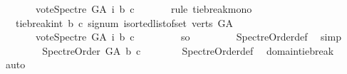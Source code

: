 \begin{isabellebody}
\ \ \ \ \ \ \ vote{\isacharunderscore}{\kern0pt}Spectre\ G{\isacharunderscore}{\kern0pt}A\ i\ b\ c{\isacharparenright}{\kern0pt}{\isacharparenright}{\kern0pt}{\isachardoublequoteclose}\isanewline
\ \ \ \ \ \ \isamarkupfalse%
{\isacharparenleft}{\kern0pt}rule\ tie{\isacharunderscore}{\kern0pt}break{\isacharunderscore}{\kern0pt}mono{\isacharparenright}{\kern0pt}\isanewline
\ \ \ \ \isamarkupfalse%
\ \isamarkupfalse%
\ {\isachardoublequoteopen}{}\ {\isasymle}\ tie{\isacharunderscore}{\kern0pt}break{\isacharunderscore}{\kern0pt}int\ b\ c\ {\isacharparenleft}{\kern0pt}signum\ {\isacharparenleft}{\kern0pt}{\isasymSum}i{\isasymleftarrow}sorted{\isacharunderscore}{\kern0pt}list{\isacharunderscore}{\kern0pt}of{\isacharunderscore}{\kern0pt}set\ {\isacharparenleft}{\kern0pt}verts\ G{\isacharunderscore}{\kern0pt}A{\isacharparenright}{\kern0pt}{\isachardot}{\kern0pt}\isanewline
\ \ \ \ \ \ \ vote{\isacharunderscore}{\kern0pt}Spectre\ G{\isacharunderscore}{\kern0pt}A\ i\ b\ c{\isacharparenright}{\kern0pt}{\isacharparenright}{\kern0pt}\ {\isachardoublequoteclose}\isanewline
\ \ \ \ \ \ \isamarkupfalse%
\ so\ \isanewline
\ \ \ \ \ \ \isamarkupfalse%
\ Spectre{\isacharunderscore}{\kern0pt}Order{\isacharunderscore}{\kern0pt}def\ \isamarkupfalse%
\ simp\isanewline
\ \ \ \ \isamarkupfalse%
\ \isamarkupfalse%
\ {\isachardoublequoteopen}\ Spectre{\isacharunderscore}{\kern0pt}Order\ G{\isacharunderscore}{\kern0pt}A\ b\ c{\isachardoublequoteclose}\isanewline
\ \ \ \ \ \ \isamarkupfalse%
\ Spectre{\isacharunderscore}{\kern0pt}Order{\isacharunderscore}{\kern0pt}def\ \isamarkupfalse%
\ domain{\isacharunderscore}{\kern0pt}tie{\isacharunderscore}{\kern0pt}break\ \isamarkupfalse%
\ auto\isanewline
\ \ \isamarkupfalse%
\isanewline
{}\isamarkupfalse%
%
\endisatagproof
{\isafoldproof}%
%
\isadelimproof
\isanewline
%
\endisadelimproof
%
\isadelimtheory
\isanewline
%
\endisadelimtheory
%
\isatagtheory
{}\isamarkupfalse%
%
\endisatagtheory
{\isafoldtheory}%
%
\isadelimtheory
%
\endisadelimtheory
%
\end{isabellebody}%
\endinput
